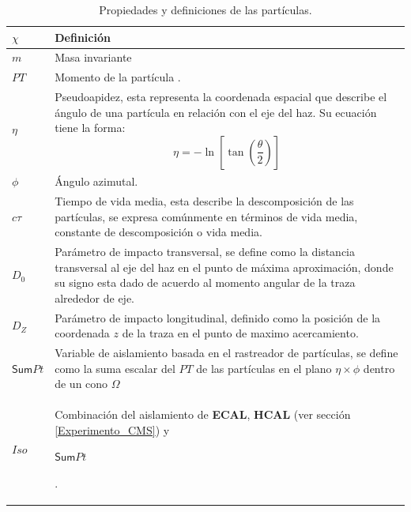 \begin{table}[!h]
\centering
\begin{tabular}{|p{1.2cm}|p{13cm}|}
\toprule
$\chi$ & Definición\\
\midrule
$m$ & Masa invariante\\
$PT$ & Momento de la partícula%
.\\
$\eta$ & Pseudoapidez, esta representa la coordenada espacial que describe el ángulo de una partícula en relación con el eje del haz. Su ecuación tiene la forma:
\begin{equation}
\eta = -\ln \left[ \tan \left( \dfrac{\theta}{2} \right)\right]
\end{equation}\\[-1cm]
$\phi$ & Ángulo azimutal.\\
$c\tau$ & Tiempo de vida media, esta describe la descomposición de las partículas, se expresa comúnmente en términos de vida media, constante de descomposición o vida media. \\

$D_0$ & Parámetro de impacto transversal, se define como la distancia transversal al eje del haz en el punto de máxima aproximación, donde su signo esta dado de acuerdo al momento angular de la traza alrededor de eje.\\

$D_Z$ & Parámetro de impacto longitudinal, definido como la posición de la coordenada $z$ de la traza en el punto de maximo acercamiento.\\
\begin{small}$\textsf{Sum}Pt$\end{small} & Variable de aislamiento basada en el rastreador de partículas, se define como la suma escalar del $PT$ de las partículas en el plano $\eta \times \phi$ dentro de un cono $\Omega$\\
$Iso$ & Combinación del aislamiento de \textbf{ECAL}, \textbf{HCAL} (ver sección \ref{Experimento_CMS}) y \begin{small}$\textsf{Sum}Pt$\end{small}.\\

\bottomrule
\end{tabular}
\caption{Propiedades y definiciones de las partículas.}
\label{propiedades}
\end{table}

